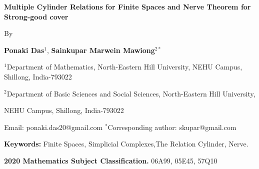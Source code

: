\documentclass[12pt,a4paper,twoside, reqno, tbtags]{article}
\numberwithin{equation}{section}
\begin{document}
	\label{pgStart}
\begin{center}
    \textbf{Multiple Cylinder Relations for Finite Spaces and Nerve Theorem for Strong-good cover}

    By
 
    \textbf{Ponaki Das$^1$}, \textbf{Sainkupar Marwein Mawiong$^{2*}$}
    
    $^1$Department of Mathematics, North-Eastern Hill University, NEHU Campus, Shillong, India-793022
    
    $^2$Department of Basic Sciences and Social Sciences, North-Eastern Hill
    University,
    
    NEHU Campus, Shillong, India-793022
    
    Email: ponaki.das20@gmail.com $^*$Corresponding author: skupar@gmail.com
\end{center}

\begin{abstract}
\noindent In this paper, we introduce the \emph{multiple cylinder of relations}, a generalization of the relation cylinder that extends the concept of the multiple non-Hausdorff mapping cylinder to sequences of finite $T_0$-spaces connected by a series of relations. This construction captures complex homotopical structures across chains of finite spaces and, when the relations are induced by maps, serves as an intermediate space that collapses onto two distinct finite spaces.

\noindent We also define the notion of a \emph{strong-good cover} for both finite simplicial complexes and finite spaces. Unlike classical good covers, which require all finite non-empty intersections to be contractible, strong-good covers impose a stricter condition: that these intersections be \emph{collapsible}. This leads to a strengthened version of the classical \emph{Nerve Theorem}, proving that finite simplicial complexes or finite spaces with strong-good covers are \emph{(simple) homotopy equivalent} to their nerves.

\noindent Furthermore, we demonstrate that strong-good covers yield significant implications in persistent homology. Specifically, we show that the associated persistence modules vanish in all positive degrees, illustrating that collapsibility enforces strong combinatorial constraints with topological consequences.
\end{abstract}


\begin{flushleft}
    \textbf{\large Keywords:}
    Finite Spaces, Simplicial Complexes,The Relation Cylinder, Nerve.
\end{flushleft}
    {\bf 2020 Mathematics Subject Classification.} {06A99, 05E45, 57Q10}
\end{document}
